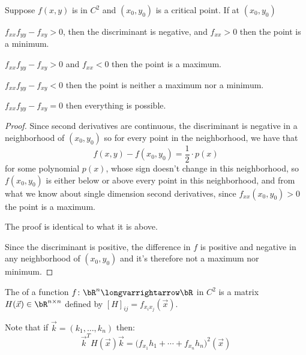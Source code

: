 \documentclass[10pt]{article}
\begin{document}
\begin{thrm*}

    Suppose $f(x,y)$ is in $C^2$ and $(x_0,y_0)$ is a critical point.
    If at $(x_0,y_0)$
    \benum
        \item $f_{xx}f_{yy}-f_{xy}>0$, then the discriminant is negative, and $f_{xx}>0$ then the point is a minimum.
        \item $f_{xx}f_{yy}-f_{xy}>0$ and $f_{xx}<0$ then the point is a maximum.
        \item $f_{xx}f_{yy}-f_{xy}<0$ then the point is neither a maximum nor a minimum.
        \item $f_{xx}f_{yy}-f_{xy}=0$ then everything is possible.
    \eenum

\end{thrm*}

\begin{proof}

    \benum
        \item Since second derivatives are continuous, the discriminant is negative in a neighborhood of $(x_0,y_0)$ so for every point in the neighborhood, we have that
        \[ f(x,y) - f(x_0,y_0) = \frac12\cdot p(x) \]
        for some polynomial $p(x)$, whose sign doesn't change in this neighborhood, so $f(x_0,y_0)$ is either below or above every point in this neighborhood, and from what we know about single dimension
        second derivatives, since $f_{xx}(x_0,y_0)>0$ the point is a maximum.
        \item The proof is identical to what it is above.
        \item Since the discriminant is positive, the difference in $f$ is positive and negative in any neighborhood of $(x_0,y_0)$ and it's therefore not a maximum nor minimum.
    \eenum

\end{proof}

\begin{defn*}

    The  of a function $f\colon\bR^n\longvarrightarrow\bR$ in $C^2$ is a matrix $H(\vec x)\in\bR^{n\times n}$ defined by $[H]_{ij}=f_{x_ix_j}(\vec x)$.

\end{defn*}

Note that if $\vec k=(k_1,\dots,k_n)$ then:
\[ \vec k^T H(\vec x)\vec k = \bigl(f_{x_1}h_1+\cdots+f_{x_n}h_n\bigr)^2(\vec x) \]
\end{document}
